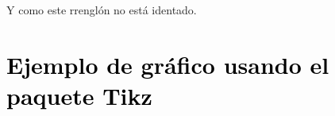 \documentclass[11pt]{article}
\begin{document}
        Y como este rrenglón no está identado.
        

    \section{\textcolor{black}{Ejemplo de gráfico usando el paquete Tikz}}

        \begin{figure} [ht]
            \centering
 
            
                \begin{tikzpicture}[x=0.70pt,y=0.70pt,yscale=-1,xscale=1]
                

\end{tikzpicture}
\end{figure}
\end{document}

